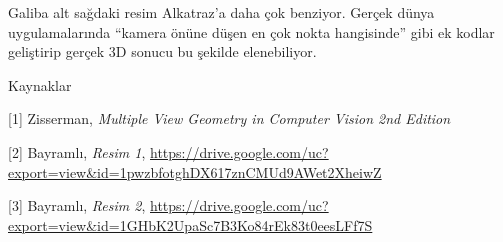 \documentclass[12pt,fleqn]{article}\usepackage{../../common}
\begin{document}
Galiba alt sağdaki resim Alkatraz'a daha çok benziyor. Gerçek dünya
uygulamalarında ``kamera önüne düşen en çok nokta hangisinde'' gibi ek
kodlar geliştirip gerçek 3D sonucu bu şekilde elenebiliyor. 

Kaynaklar

[1] Zisserman, {\em Multiple View Geometry in Computer Vision 2nd Edition}

[2] Bayramlı, {\em Resim 1}, \url{https://drive.google.com/uc?export=view&id=1pwzbfotghDX617znCMUd9AWet2XheiwZ}

[3] Bayramlı, {\em Resim 2}, \url{https://drive.google.com/uc?export=view&id=1GHbK2UpaSc7B3Ko84rEk83t0eesLFf7S}
\end{document}
